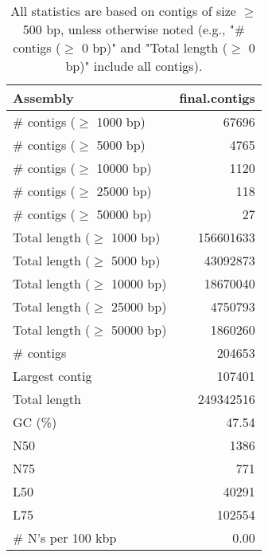 \documentclass[12pt,a4paper]{article}
\begin{document}
\begin{table}[ht]
\begin{center}
\caption{All statistics are based on contigs of size $\geq$ 500 bp, unless otherwise noted (e.g., "\# contigs ($\geq$ 0 bp)" and "Total length ($\geq$ 0 bp)" include all contigs).}
\begin{tabular}{|l*{1}{|r}|}
\hline
Assembly & final.contigs \\ \hline
\# contigs ($\geq$ 1000 bp) & 67696 \\ \hline
\# contigs ($\geq$ 5000 bp) & 4765 \\ \hline
\# contigs ($\geq$ 10000 bp) & 1120 \\ \hline
\# contigs ($\geq$ 25000 bp) & 118 \\ \hline
\# contigs ($\geq$ 50000 bp) & 27 \\ \hline
Total length ($\geq$ 1000 bp) & 156601633 \\ \hline
Total length ($\geq$ 5000 bp) & 43092873 \\ \hline
Total length ($\geq$ 10000 bp) & 18670040 \\ \hline
Total length ($\geq$ 25000 bp) & 4750793 \\ \hline
Total length ($\geq$ 50000 bp) & 1860260 \\ \hline
\# contigs & 204653 \\ \hline
Largest contig & 107401 \\ \hline
Total length & 249342516 \\ \hline
GC (\%) & 47.54 \\ \hline
N50 & 1386 \\ \hline
N75 & 771 \\ \hline
L50 & 40291 \\ \hline
L75 & 102554 \\ \hline
\# N's per 100 kbp & 0.00 \\ \hline
\end{tabular}
\end{center}
\end{table}
\end{document}
